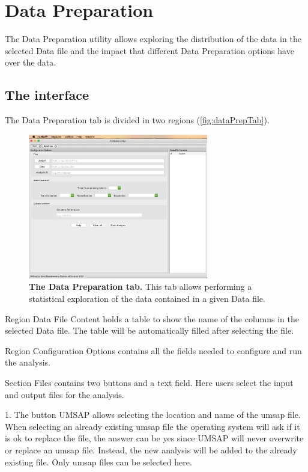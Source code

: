 \chapter{Data Preparation}
\label{chap:dataPrep}

The Data Preparation utility allows exploring the distribution of the data in the
selected Data file and the impact that different Data Preparation options have over
the data.

\section{The interface}

The Data Preparation tab is divided in two regions (\autoref{fig:dataPrepTab}).

\begin{figure}[h]
    \centering
    \includegraphics[width=0.7\textwidth]{./IMAGES/DATAPREP/DataPrep.jpg}
    \caption[The Data Preparation tab]{\textbf{The Data Preparation tab.}
    This tab allows performing a statistical exploration of the data contained in
    a given Data file.} 
    \label{fig:dataPrepTab}
    \vspace{-5pt}
\end{figure}

Region Data File Content holds a table to show the name of the columns in
the selected Data file. The table will be automatically filled after selecting the
file.

Region Configuration Options contains all the fields needed to configure and
run the analysis. 

Section Files contains two buttons and a text field. Here users select the input
and output files for the analysis.

\num{1}. The button UMSAP allows selecting the location
and name of the umsap file. When selecting an already existing umsap file the operating
system will ask if it is ok to replace the file, the answer can be yes since UMSAP
will never overwrite or replace an umsap file. Instead, the new analysis will be
added to the already existing file. Only umsap files can be selected here.


